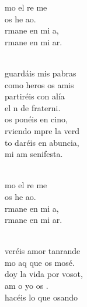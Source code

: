\documentclass[12pt]{article}
\begin{document}
\begin{multicols*}{2}
\begin{cancion}[Amaos][Kairoi]%
	\begin{chorus}%
	mo el re me  \\
	 os he ao.\\
	rmane en mi a,\\
	rmane en mi ar.\\
	\end{chorus}%
	\jump\\
	guardáis mis pabras\\
	como heros os amis\\
	partiréis con alía\\
	el n de fraterni.\\
	os ponéis en cino,\\
	rviendo mpre la verd\\
	to daréis en abuncia,\\
	mi am senifesta.\\\jump\\
	\begin{chorus}%
	mo el re me  \\
	 os he ao.\\
	rmane en mi a,\\
	rmane en mi ar.\\
	\end{chorus}%
	\jump\\
	veréis amor tanrande\\
	mo aq que os mosé.\\
	doy la vida por vosot,\\
	am o yo os . \\
	hacéis lo que osando\\

\end{cancion}
\end{multicols*}
\end{document}
